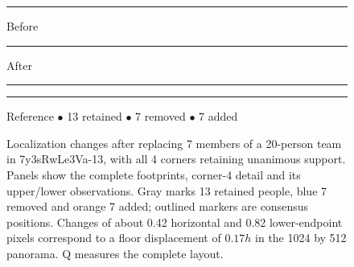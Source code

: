 \begin{figure}[t]
\centering
\setcounter{subfigure}{0}
\begin{minipage}{\textwidth}
\centering
{\footnotesize
\textcolor{paperBlue}{\rule[2pt]{10pt}{0.8pt}} Before\quad
\textcolor{paperOrange}{\rule[2pt]{10pt}{0.8pt}} After\quad
\textcolor{figGray}{\rule[2pt]{4pt}{0.8pt}\hspace{2pt}\rule[2pt]{4pt}{0.8pt}} Reference\qquad
\textcolor{figGray}{$\bullet$} 13 retained\quad
\textcolor{paperBlue}{$\bullet$} 7 removed\quad
\textcolor{paperOrange}{$\bullet$} 7 added\par}
\vspace{3pt}
%
\hfill%
%
\hfill%
%
\hfill%

\end{minipage}
\caption{Localization changes after replacing 7 members of a 20-person team in 7y3sRwLe3Va-13, with all 4 corners retaining unanimous support. Panels show the complete footprints, corner-4 detail and its upper/lower observations. Gray marks 13 retained people, blue 7 removed and orange 7 added; outlined markers are consensus positions. Changes of about 0.42 horizontal and 0.82 lower-endpoint pixels correspond to a floor displacement of $0.17h$ in the 1024 by 512 panorama. Q measures the complete layout.}
\label{fig:localization-mechanism}
\end{figure}

